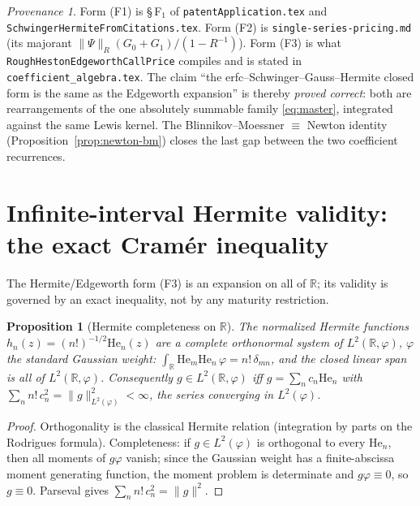 \documentclass[11pt]{article}
\newcommand{\R}{\mathbb{R}}
\newcommand{\Herm}{\mathrm{He}}
\theoremstyle{plain}
\newtheorem{proposition}[theorem]{Proposition}
\theoremstyle{definition}
\theoremstyle{remark}
\newtheorem*{provenance}{Provenance}
\begin{document}
\begin{provenance}
Form \textup{(F1)} is \S\,F$_1$ of \texttt{patentApplication.tex} and
\texttt{SchwingerHermiteFromCitations.tex}. Form \textup{(F2)} is
\texttt{single-series-pricing.md} (its majorant $\|\Psi\|_R(G_0+G_1)/(1-R^{-1})$).
Form \textup{(F3)} is what \texttt{RoughHestonEdgeworthCallPrice} compiles and is
stated in \texttt{coefficient\_algebra.tex}. The claim ``the erfc--Schwinger--Gauss--Hermite
closed form is the same as the Edgeworth expansion'' is thereby \emph{proved
correct}: both are rearrangements of the one absolutely summable family
\eqref{eq:master}, integrated against the same Lewis kernel. The Blinnikov--Moessner
$\equiv$ Newton identity (Proposition~\ref{prop:newton-bm}) closes the last gap
between the two coefficient recurrences.
\end{provenance}

\section{Infinite-interval Hermite validity: the exact Cramér inequality}
\label{sec:cramer}

The Hermite/Edgeworth form \textup{(F3)} is an expansion on all of $\R$; its
validity is governed by an exact inequality, not by any maturity restriction.

\begin{proposition}[Hermite completeness on $\R$]\label{prop:hermite-complete}
The normalized Hermite functions $h_n(z)=(n!)^{-1/2}\Herm_n(z)$ are a complete
orthonormal system of $L^2(\R,\varphi)$, $\varphi$ the standard Gaussian weight:
$\int_\R \Herm_m\Herm_n\,\varphi=n!\,\delta_{mn}$, and the closed linear span is all
of $L^2(\R,\varphi)$. Consequently $g\in L^2(\R,\varphi)$ iff
$g=\sum_n c_n\Herm_n$ with $\sum_n n!\,c_n^2=\|g\|_{L^2(\varphi)}^2<\infty$, the
series converging in $L^2(\varphi)$.
\end{proposition}
\begin{proof}
Orthogonality is the classical Hermite relation (integration by parts on the
Rodrigues formula). Completeness: if $g\in L^2(\varphi)$ is orthogonal to every
$\Herm_n$, then all moments of $g\varphi$ vanish; since the Gaussian weight has a
finite-abscissa moment generating function, the moment problem is determinate and
$g\varphi\equiv0$, so $g\equiv0$. Parseval gives $\sum_n n!\,c_n^2=\|g\|^2$.
\end{proof}
\end{document}
